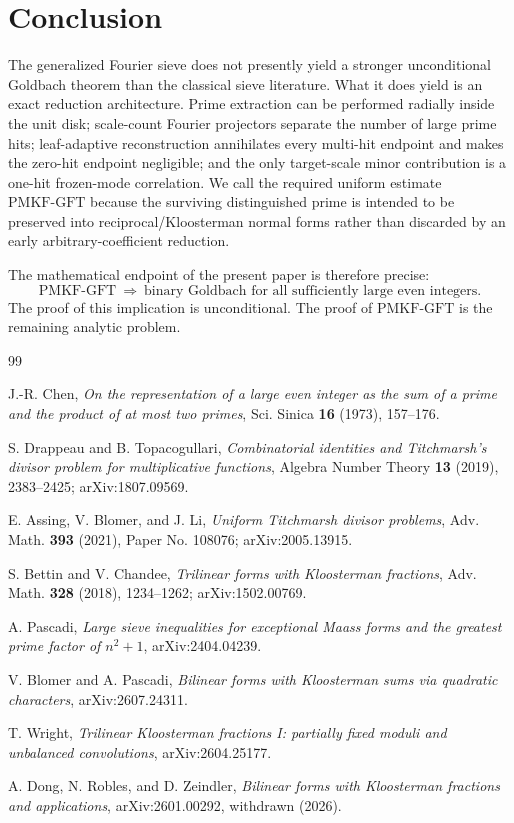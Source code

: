 \documentclass[11pt]{article}
\theoremstyle{definition}
\theoremstyle{remark}
\newcommand{\1}{\mathbf 1}
\newcommand{\PMKF}{\mathrm{PMKF}\text{-}\mathrm{GFT}}
\begin{document}
\section{Conclusion}

The generalized Fourier sieve does not presently yield a stronger unconditional Goldbach theorem than the classical sieve literature.  What it does yield is an exact reduction architecture.  Prime extraction can be performed radially inside the unit disk; scale-count Fourier projectors separate the number of large prime hits; leaf-adaptive reconstruction annihilates every multi-hit endpoint and makes the zero-hit endpoint negligible; and the only target-scale minor contribution is a one-hit frozen-mode correlation.  We call the required uniform estimate $\PMKF$ because the surviving distinguished prime is intended to be preserved into reciprocal/Kloosterman normal forms rather than discarded by an early arbitrary-coefficient reduction.

The mathematical endpoint of the present paper is therefore precise:
\[
\boxed{\PMKF\ \Longrightarrow\ \text{binary Goldbach for all sufficiently large even integers}.}
\]
The proof of this implication is unconditional.  The proof of $\PMKF$ is the remaining analytic problem.

\begin{thebibliography}{99}

J.-R. Chen,
\emph{On the representation of a large even integer as the sum of a prime and the product of at most two primes},
Sci. Sinica \textbf{16} (1973), 157--176.

S. Drappeau and B. Topacogullari,
\emph{Combinatorial identities and Titchmarsh's divisor problem for multiplicative functions},
Algebra Number Theory \textbf{13} (2019), 2383--2425;
arXiv:1807.09569.

E. Assing, V. Blomer, and J. Li,
\emph{Uniform Titchmarsh divisor problems},
Adv. Math. \textbf{393} (2021), Paper No. 108076;
arXiv:2005.13915.

S. Bettin and V. Chandee,
\emph{Trilinear forms with Kloosterman fractions},
Adv. Math. \textbf{328} (2018), 1234--1262;
arXiv:1502.00769.

A. Pascadi,
\emph{Large sieve inequalities for exceptional Maass forms and the greatest prime factor of $n^2+1$},
arXiv:2404.04239.

V. Blomer and A. Pascadi,
\emph{Bilinear forms with Kloosterman sums via quadratic characters},
arXiv:2607.24311.

T. Wright,
\emph{Trilinear Kloosterman fractions I: partially fixed moduli and unbalanced convolutions},
arXiv:2604.25177.

A. Dong, N. Robles, and D. Zeindler,
\emph{Bilinear forms with Kloosterman fractions and applications},
arXiv:2601.00292, withdrawn (2026).

\end{thebibliography}
\end{document}
